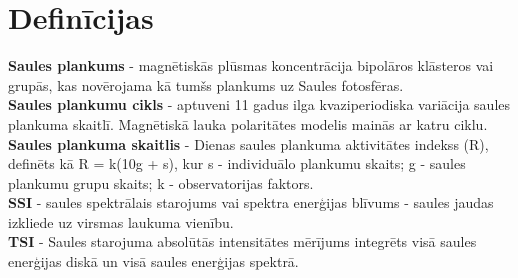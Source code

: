\section{Definīcijas}
\noindent \textbf{Saules plankums} - magnētiskās plūsmas koncentrācija bipolāros klāsteros vai grupās, kas novērojama kā tumšs plankums uz Saules fotosfēras.\\
\textbf{Saules plankumu cikls} - aptuveni 11 gadus ilga kvaziperiodiska variācija saules plankuma skaitlī. Magnētiskā lauka polaritātes modelis mainās ar katru ciklu.\\
\textbf{Saules plankuma skaitlis} - Dienas saules plankuma aktivitātes indekss (R), definēts kā R = k(10g + s), kur
s - individuālo plankumu skaits;
g - saules plankumu grupu skaits;
k - observatorijas faktors.\\
\textbf{SSI} - saules spektrālais starojums vai spektra enerģijas blīvums - saules jaudas izkliede uz virsmas laukuma vienību.\\
\textbf{TSI} - Saules starojuma absolūtās intensitātes mērījums integrēts visā saules enerģijas diskā un visā saules enerģijas spektrā.
